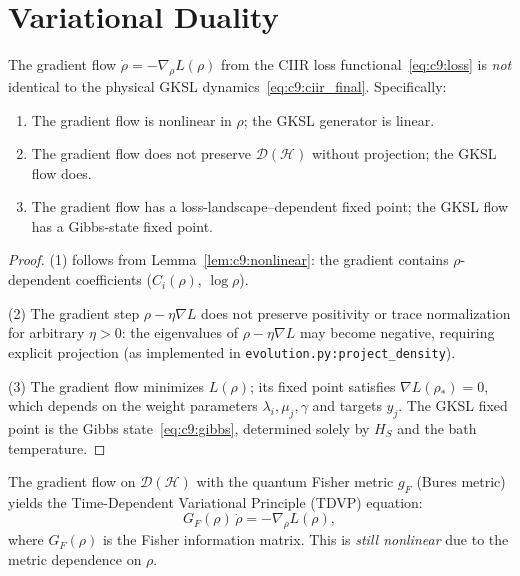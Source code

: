 \section{Variational Duality}
\label{sec:c9:variational}

\begin{theorem}
\label{thm:c9:grad_neq_phys}
The gradient flow $\dot{\rho} = -\nabla_\rho L(\rho)$ from the CIIR
loss functional~\eqref{eq:c9:loss} is \emph{not} identical to the
physical GKSL dynamics~\eqref{eq:c9:ciir_final}.  Specifically:
\begin{enumerate}
\item The gradient flow is nonlinear in $\rho$; the GKSL generator is
  linear.
\item The gradient flow does not preserve $\mathcal{D}(\mathcal{H})$
  without projection; the GKSL flow does.
\item The gradient flow has a loss-landscape--dependent fixed point; the
  GKSL flow has a Gibbs-state fixed point.
\end{enumerate}
\end{theorem}

\begin{proof}
(1) follows from Lemma~\ref{lem:c9:nonlinear}: the gradient contains
$\rho$-dependent coefficients ($C_i(\rho)$, $\log\rho$).

(2) The gradient step $\rho - \eta \nabla L$ does not preserve positivity
or trace normalization for arbitrary $\eta > 0$: the eigenvalues of
$\rho - \eta \nabla L$ may become negative, requiring explicit projection
(as implemented in \texttt{evolution.py:project\_density}).

(3) The gradient flow minimizes $L(\rho)$; its fixed point satisfies
$\nabla L(\rho_*) = 0$, which depends on the weight parameters
$\lambda_i, \mu_j, \gamma$ and targets $y_j$.  The GKSL fixed point is
the Gibbs state~\eqref{eq:c9:gibbs}, determined solely by $H_S$ and the
bath temperature.
\end{proof}

\begin{proposition}
\label{prop:c9:tdvp}
The gradient flow on $\mathcal{D}(\mathcal{H})$ with the quantum Fisher
metric $g_F$ (Bures metric) yields the Time-Dependent Variational
Principle (TDVP) equation:
\begin{equation}
  G_F(\rho)\, \dot{\rho} = -\nabla_\rho L(\rho),
  \label{eq:c9:tdvp}
\end{equation}
where $G_F(\rho)$ is the Fisher information matrix.  This is
\emph{still nonlinear} due to the metric dependence on $\rho$.
\end{proposition}

